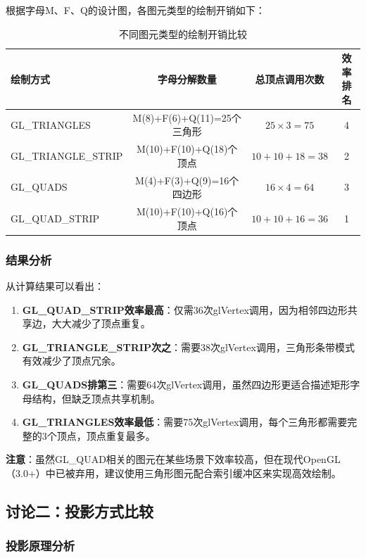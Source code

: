 \documentclass[a4paper]{article}
\begin{document}
根据字母M、F、Q的设计图，各图元类型的绘制开销如下：

\begin{table}[H]
\centering
\caption{不同图元类型的绘制开销比较}
\begin{tabular}{|l|c|c|c|}
\hline
绘制方式 & 字母分解数量 & 总顶点调用次数 & 效率排名 \\
\hline
GL\_TRIANGLES & M(8)+F(6)+Q(11)=25个三角形 & $25 \times 3 = 75$ & 4 \\
GL\_TRIANGLE\_STRIP & M(10)+F(10)+Q(18)个顶点 & $10+10+18 = 38$ & 2 \\
GL\_QUADS & M(4)+F(3)+Q(9)=16个四边形 & $16 \times 4 = 64$ & 3 \\
GL\_QUAD\_STRIP & M(10)+F(10)+Q(16)个顶点 & $10+10+16 = 36$ & 1 \\
\hline
\end{tabular}
\label{tab:draw_cost}
\end{table}

\subsubsection{结果分析}

从计算结果可以看出：

\begin{enumerate}
    \item \textbf{GL\_QUAD\_STRIP效率最高}：仅需36次glVertex调用，因为相邻四边形共享边，大大减少了顶点重复。
    
    \item \textbf{GL\_TRIANGLE\_STRIP次之}：需要38次glVertex调用，三角形条带模式有效减少了顶点冗余。
    
    \item \textbf{GL\_QUADS排第三}：需要64次glVertex调用，虽然四边形更适合描述矩形字母结构，但缺乏顶点共享机制。
    
    \item \textbf{GL\_TRIANGLES效率最低}：需要75次glVertex调用，每个三角形都需要完整的3个顶点，顶点重复最多。
\end{enumerate}

\textbf{注意}：虽然GL\_QUAD相关的图元在某些场景下效率较高，但在现代OpenGL（3.0+）中已被弃用，建议使用三角形图元配合索引缓冲区来实现高效绘制。

\subsection{讨论二：投影方式比较}

\subsubsection{投影原理分析}
\end{document}
